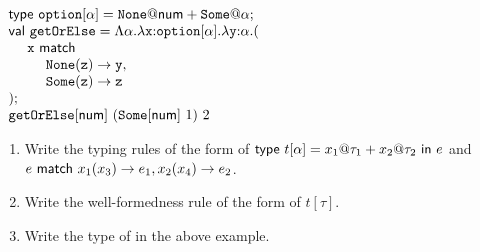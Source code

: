 \begin{exercise}
\vspace{0.5em}
$
  \begin{array}{l}
    \textsf{type}\ \code{option}[\alpha]=\code{None}@\tnum+\code{Some}@\alpha;\\
    \textsf{val}\ \code{getOrElse}=\etfun{\alpha}{\efun{\code{x}{:}\code{option}[\alpha]}{
      \efun{\code{y}{:}\alpha}{(}} \\
    \ \ \ \ \code{x}\ \textsf{match}} \\
    \ \ \ \ \ \ \ \ \code{None}(\code{z})\rightarrow\code{y}, \\
    \ \ \ \ \ \ \ \ \code{Some}(\code{z})\rightarrow\code{z} \\
    );\\
    \eapp{\eapp{\etapp{\code{getOrElse}}{\tnum}}{(\eapp{\etapp{\code{Some}}{\tnum}}{1})}}{2}
  \end{array}
$
\vspace{0.5em}

\begin{enumerate}
\item
  Write the typing rules of the form
     of
    $\textsf{type}\ t[\alpha]=x_1@\tau_1+x_2@\tau_2\ \textsf{in}\ e$ and
    $e\ \textsf{match}\ x_1(x_3)\rightarrow e_1,x_2(x_4)\rightarrow e_2$.
\item
  Write the well-formedness rule of the form
    \fbox{$\Gamma\vdash\tau$} of $t[\tau]$.
\item
  Write the type of  in the above example.
\end{enumerate}

\end{exercise}

